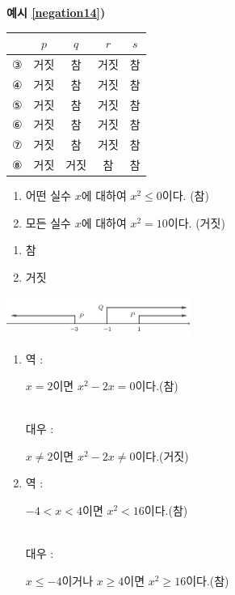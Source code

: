 \documentclass{oblivoir}
\begin{document}
\begin{multicols*}{2}
%
\begin{enumerate*}[itemjoin={\:\:\:}]
\end{enumerate*}

%
\par\bigskip\noindent\textbf{예시 \ref{negation14})}\par\noindent
\begin{center}
\begin{tabu}[tabulinesep=100pt]{c|cccc}
	&\(p\)	&\(q\)	&\(r\)	&\(s\)\\\hline
③	&거짓	&참		&거짓	&참	\\
④	&거짓	&참		&거짓	&참	\\
⑤	&거짓	&참		&거짓	&참	\\
⑥	&거짓	&참		&거짓	&참	\\
⑦	&거짓	&참		&거짓	&참	\\
⑧	&거짓	&거짓	&참		&참	
\end{tabu}
\end{center}

%
\begin{enumerate}
\item
어떤 실수 \(x\)에 대하여 \(x^2\le0\)이다.
(참)
\item
모든 실수 \(x\)에 대하여 \(x^2=10\)이다.
(거짓)
\end{enumerate}

%
\begin{enumerate}%
\item
참
\item
거짓
\end{enumerate}
\begin{center}
\includegraphics[width=0.45\textwidth]{pq_4}
\end{center}

%
\four

%
\begin{enumerate}
\item
역 : \parbox[t]{0.35\textwidth}{\(x=2\)이면 \(x^2-2x=0\)이다.(참)}\\
대우 :  \parbox[t]{0.32\textwidth}{\(x\neq2\)이면 \(x^2-2x\neq0\)이다.(거짓)}
\item
역 : \parbox[t]{0.35\textwidth}{\(-4< x<4\)이면 \(x^2<16\)이다.(참)}\\
대우 :  \parbox[t]{0.32\textwidth}{\(x\le-4\)이거나 \(x\ge4\)이면 \(x^2\ge16\)이다.(참)}
\end{enumerate}


\end{multicols*}
\end{document}
